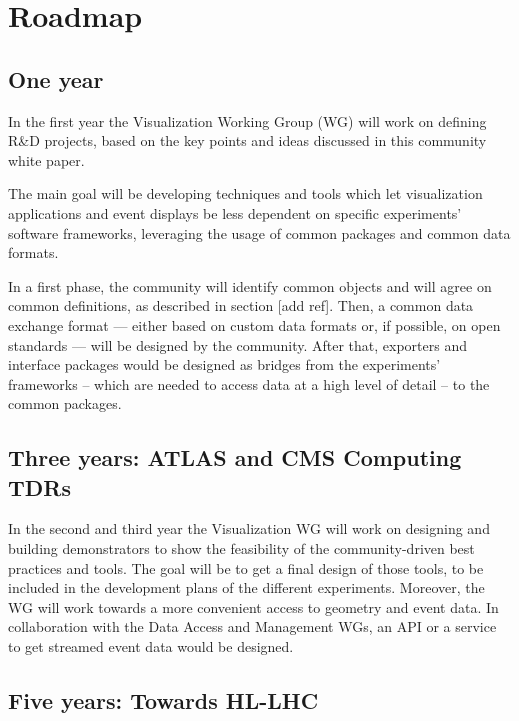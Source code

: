 \documentclass[12pt,a4paper]{article}
\begin{document}
\hypertarget{roadmap}{%
\section{Roadmap}\label{roadmap}}

\hypertarget{one-year}{%
\subsection{One year}\label{one-year}}

In the first year the Visualization Working Group (WG) will work on defining R{\&}D projects, based on the key
points and ideas discussed in this community white paper.

The main goal will be developing techniques and tools which let visualization applications and event displays be
less dependent on specific experiments’ software frameworks, leveraging the usage of common packages and common data formats.

In a first phase, the community will identify common objects and will agree on common definitions, as described in
section [add ref]. Then, a common data exchange format --- either based on custom data formats or, if possible, on
open standards --- will be designed by the community. After that, exporters and interface packages would be designed
as bridges from the experiments’ frameworks -- which are needed to access data at a high level of detail -- to the common packages.

\hypertarget{three-year}{%
\subsection{Three years: ATLAS and CMS Computing TDRs}\label{three-year}}

In the second and third year the Visualization WG will work on designing and building demonstrators to show the feasibility of
the community-driven best practices and tools. The goal will be to get a final design of those tools, to be included in the development
plans of the different experiments. Moreover, the WG will work towards a more convenient access to geometry and event data.
In collaboration with the Data Access and Management WGs, an API or a service to get streamed event data would be designed.

\hypertarget{five-year}{%
\subsection{Five years: Towards HL-LHC}\label{five-year}}
\end{document}
